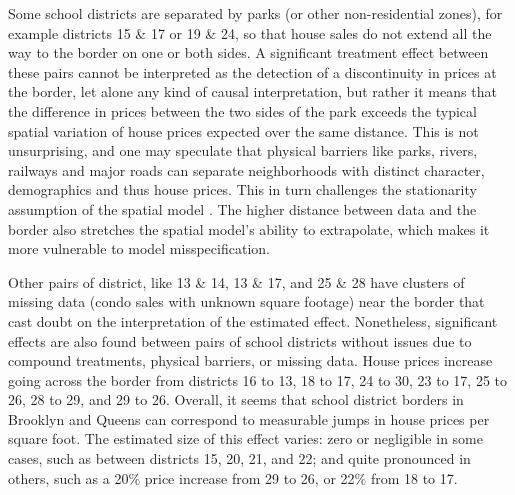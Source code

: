 	Some school districts are separated by parks (or other non-residential zones), for example districts 15 \& 17 or 19 \& 24, so that house sales do not extend all the way to the border on one or both sides.
A significant treatment effect between these pairs cannot be interpreted as the detection of a discontinuity in prices at the border, let alone any kind of causal interpretation, but rather it means that the difference in prices between the two sides of the park exceeds the typical spatial variation of house prices expected over the same distance.
This is not unsurprising, and one may speculate that physical barriers like parks, rivers, railways and major roads can separate neighborhoods with distinct character, demographics and thus house prices.
This in turn challenges the stationarity assumption of the spatial model .
The higher distance between data and the border also stretches the spatial model's ability to extrapolate, which makes it more vulnerable to model misspecification.

	Other pairs of district, like 13 \& 14, 13 \& 17, and 25 \& 28 have clusters of missing data (condo sales with unknown square footage) near the border that cast doubt on the interpretation of the estimated effect.
Nonetheless, significant effects are also found between pairs of school districts without issues due to compound treatments, physical barriers, or missing data.
House prices increase going across the border from districts 16 to 13, 18 to 17, 24 to 30, 23 to 17, 25 to 26, 28 to 29, and 29 to 26.
Overall, it seems that school district borders in Brooklyn and Queens can correspond to measurable jumps in house prices per square foot.
The estimated size of this effect varies: zero or negligible in some cases, such as between districts 15, 20, 21, and 22; and quite pronounced in others, such as a 20\% price increase from 29 to 26, or 22\% from 18 to 17.

